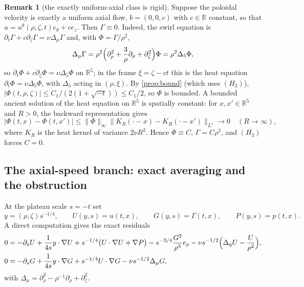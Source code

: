 \documentclass[11pt]{article}
\theoremstyle{definition}
\newtheorem{remark}[theorem]{Remark}
\newcommand{\R}{\mathbb{R}}
\newcommand{\grad}{\nabla}
\begin{document}
\begin{remark}[the exactly uniform-axial class is rigid]
\label{rem:axialrigid}
Suppose the poloidal velocity is exactly a uniform axial flow,
$b=(0,0,c)$ with $c\in\R$ constant, so that
$u=u^\theta(\rho,\zeta,t)e_\theta+c e_z$. Then $\Gamma\equiv0$. Indeed, the
swirl equation is $\partial_t\Gamma+c\partial_\zeta\Gamma
=\nu\Delta_\mu\Gamma$ and, with $\Phi=\Gamma/\rho^2$,
\begin{equation}
\Delta_\mu\Gamma
=\rho^2\Bigl(\partial_\rho^2+\frac3\rho\partial_\rho
+\partial_\zeta^2\Bigr)\Phi
=\rho^2\Delta_5\Phi,
\end{equation}
so $\partial_t\Phi+c\partial_\zeta\Phi=\nu\Delta_5\Phi$ on $\R^5$; in the
frame $\xi=\zeta-ct$ this is the heat equation
$\partial_t\Phi=\nu\Delta_5\Phi$, with $\Delta_5$ acting in $(\rho,\xi)$.
By \cref{prop:bound} (which uses $(H_2)$),
$|\Phi(t,\rho,\zeta)|\le C_1/(2(1+\sqrt{-t}))\le C_1/2$, so $\Phi$ is bounded.
A bounded ancient solution of the heat equation on $\R^5$ is spatially
constant: for $x,x'\in\R^5$ and $R>0$, the backward representation gives
\begin{equation}
|\Phi(t,x)-\Phi(t,x')|
\le \|\Phi\|_\infty
\|K_R(\cdot-x)-K_R(\cdot-x')\|_{L^1}\longrightarrow0
\quad(R\to\infty),
\end{equation}
where $K_R$ is the heat kernel of variance $2\nu R^2$. Hence $\Phi\equiv C$,
$\Gamma=C\rho^2$, and $(H_3)$ forces $C=0$.
\end{remark}

\subsection{The axial-speed branch: exact averaging and the obstruction}

At the plateau scale $s=-t$ set
\begin{equation}
y=(\rho,\zeta)s^{-1/4},\qquad U(y,s)=u(t,x),\qquad
G(y,s)=\Gamma(t,x),\qquad P(y,s)=p(t,x).
\end{equation}
A direct computation gives the exact residuals
\begin{align}
0&=-\partial_sU+\frac{1}{4s}y\cdot\grad U
+s^{-1/4}\bigl(U\cdot\grad U+\grad P\bigr)
-s^{-3/4}\frac{G^2}{\rho^3}e_\rho
-\nu s^{-1/2}\Bigl(\Delta_yU-\frac{U}{\rho^2}\Bigr),
\label{eq:resU}\\
0&=-\partial_sG+\frac{1}{4s}y\cdot\grad G
+s^{-1/4}U\cdot\grad G
-\nu s^{-1/2}\Delta_\mu G,
\label{eq:resG}
\end{align}
with $\Delta_\mu=\partial_\rho^2-\rho^{-1}\partial_\rho+\partial_\zeta^2$.
\end{document}
